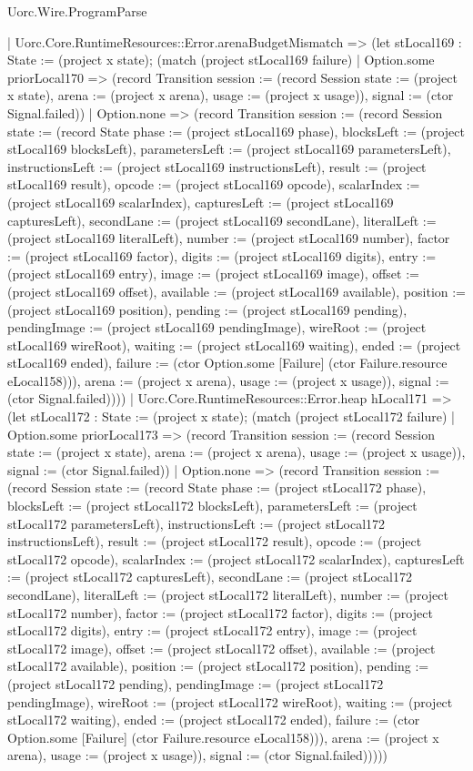 \begin{lexlean}{Uorc.Wire.ProgramParse}
\begin{semanticmodule}
{      | Uorc.Core.RuntimeResources::Error.arenaBudgetMismatch => (let stLocal169 : State := (project x state); (match (project stLocal169 failure)
        | Option.some priorLocal170 => (record Transition {session := (record Session {state := (project x state), arena := (project x arena), usage := (project x usage)}), signal := (ctor Signal.failed)})
        | Option.none => (record Transition {session := (record Session {state := (record State {phase := (project stLocal169 phase), blocksLeft := (project stLocal169 blocksLeft), parametersLeft := (project stLocal169 parametersLeft), instructionsLeft := (project stLocal169 instructionsLeft), result := (project stLocal169 result), opcode := (project stLocal169 opcode), scalarIndex := (project stLocal169 scalarIndex), capturesLeft := (project stLocal169 capturesLeft), secondLane := (project stLocal169 secondLane), literalLeft := (project stLocal169 literalLeft), number := (project stLocal169 number), factor := (project stLocal169 factor), digits := (project stLocal169 digits), entry := (project stLocal169 entry), image := (project stLocal169 image), offset := (project stLocal169 offset), available := (project stLocal169 available), position := (project stLocal169 position), pending := (project stLocal169 pending), pendingImage := (project stLocal169 pendingImage), wireRoot := (project stLocal169 wireRoot), waiting := (project stLocal169 waiting), ended := (project stLocal169 ended), failure := (ctor Option.some [Failure] (ctor Failure.resource eLocal158))}), arena := (project x arena), usage := (project x usage)}), signal := (ctor Signal.failed)})))
      | Uorc.Core.RuntimeResources::Error.heap hLocal171 => (let stLocal172 : State := (project x state); (match (project stLocal172 failure)
        | Option.some priorLocal173 => (record Transition {session := (record Session {state := (project x state), arena := (project x arena), usage := (project x usage)}), signal := (ctor Signal.failed)})
        | Option.none => (record Transition {session := (record Session {state := (record State {phase := (project stLocal172 phase), blocksLeft := (project stLocal172 blocksLeft), parametersLeft := (project stLocal172 parametersLeft), instructionsLeft := (project stLocal172 instructionsLeft), result := (project stLocal172 result), opcode := (project stLocal172 opcode), scalarIndex := (project stLocal172 scalarIndex), capturesLeft := (project stLocal172 capturesLeft), secondLane := (project stLocal172 secondLane), literalLeft := (project stLocal172 literalLeft), number := (project stLocal172 number), factor := (project stLocal172 factor), digits := (project stLocal172 digits), entry := (project stLocal172 entry), image := (project stLocal172 image), offset := (project stLocal172 offset), available := (project stLocal172 available), position := (project stLocal172 position), pending := (project stLocal172 pending), pendingImage := (project stLocal172 pendingImage), wireRoot := (project stLocal172 wireRoot), waiting := (project stLocal172 waiting), ended := (project stLocal172 ended), failure := (ctor Option.some [Failure] (ctor Failure.resource eLocal158))}), arena := (project x arena), usage := (project x usage)}), signal := (ctor Signal.failed)}))))
}
\end{semanticmodule}
\end{lexlean}
